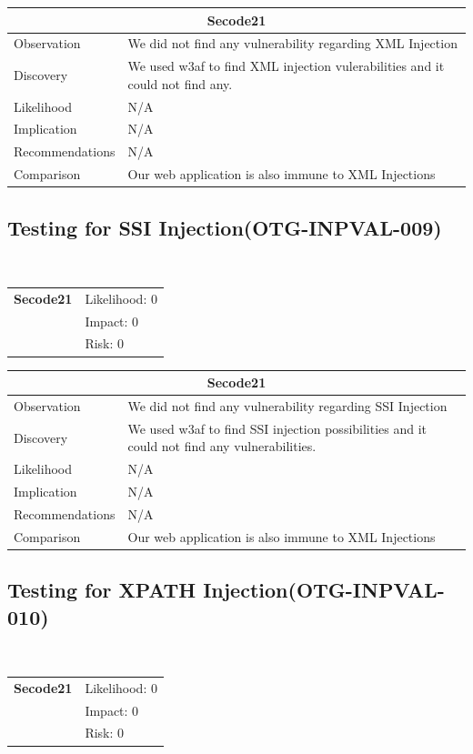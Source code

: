 \documentclass[headsepline,footsepline,footinclude=false,oneside,fontsize=11pt,paper=a4,listof=totoc,bibliography=totoc]{scrbook} %
\begin{document}
\begin{tabular}{ l|p{11cm}  }
	\hline
	\multicolumn{2}{c}{\textbf{Secode21}} \\
	\hline
	Observation   & We did not find any vulnerability regarding XML Injection\\
	Discovery  & We used w3af to find XML injection vulerabilities and it could not find any. \\
	Likelihood & N/A \\
	Implication    & N/A \\
	Recommendations & N/A \\
	Comparison& Our web application is also immune to XML Injections \\
	\hline
\end{tabular}

\pagebreak
\subsection{Testing for SSI Injection(OTG-INPVAL-009)}\

\begin{tabular}{cR{12cm}}
	\textbf{Secode21} & Likelihood: 0\\& Impact: 0\\& Risk: 0
\end{tabular}

\begin{tabular}{ l|p{11cm}  }
	\hline
	\multicolumn{2}{c}{\textbf{Secode21}} \\
	\hline
	Observation   & We did not find any vulnerability regarding SSI Injection\\
	Discovery  & We used w3af to find SSI injection possibilities and it could not find any vulnerabilities. \\
	Likelihood & N/A \\
	Implication    & N/A \\
	Recommendations & N/A \\
	Comparison& Our web application is also immune to XML Injections \\
	\hline
\end{tabular}

\pagebreak
\subsection{Testing for XPATH Injection(OTG-INPVAL-010)}\

\begin{tabular}{cR{12cm}}
	\textbf{Secode21} & Likelihood: 0\\& Impact: 0\\& Risk: 0
\end{tabular}
\end{document}
